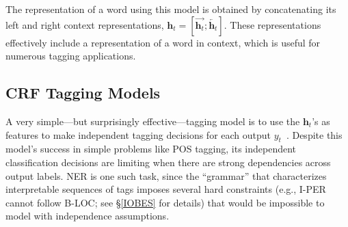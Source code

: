 \documentclass[11pt,letterpaper]{article}
\begin{document}
The representation of a word using this model is obtained by concatenating its left and right context representations, $\mathbf{h}_{t} = [\overrightarrow{\mathbf{h}_{t}} ; \overleftarrow{\mathbf{h}_{t}}]$. These representations effectively include a representation of a word in context, which is useful for numerous tagging applications.

\subsection{CRF Tagging Models}
\label{sec:crf}

A very simple---but surprisingly effective---tagging model is to use the $\mathbf{h}_t$'s as features to make independent tagging decisions for each output $y_t$~\cite{ling:2015}. Despite this model's success in simple problems like POS tagging, its independent classification decisions are limiting when there are strong dependencies across output labels. NER is one such task, since the ``grammar'' that characterizes interpretable sequences of tags imposes several hard constraints (e.g., I-PER cannot follow B-LOC; see \S\ref{IOBES} for details) that would be impossible to model with independence assumptions.
\end{document}
